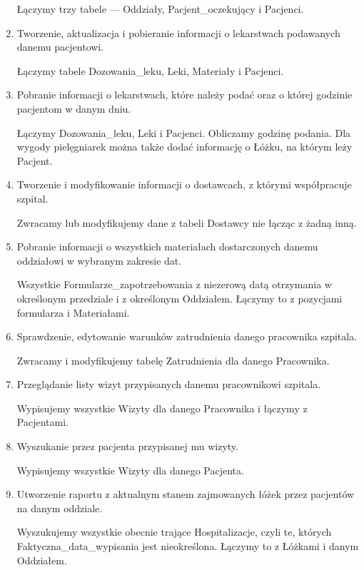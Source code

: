 \begin{enumerate}
Łączymy trzy tabele --- Oddziały, Pacjent\_oczekujący i Pacjenci.

\item Tworzenie, aktualizacja i pobieranie informacji o lekarstwach podawanych danemu pacjentowi.

Łączymy tabele Dozowania\_leku, Leki, Materiały i Pacjenci.

\item Pobranie informacji o lekarstwach, które należy podać oraz o której godzinie pacjentom w danym dniu.

Łączymy Dozowania\_leku, Leki i Pacjenci. Obliczamy godzinę podania. Dla wygody pielęgniarek można także dodać informację o Łóżku, na którym leży Pacjent.

\item Tworzenie i  modyfikowanie informacji o dostawcach, z którymi współpracuje szpital.

Zwracamy lub modyfikujemy dane z tabeli Dostawcy nie łącząc z żadną inną.

\item Pobranie informacji o wszystkich materiałach dostarczonych danemu oddziałowi w wybranym zakresie dat.

Wszystkie Formularze\_zapotrzebowania z niezerową datą otrzymania w określonym przedziale i z określonym Oddziałem. Łączymy to z pozycjami formularza i Materiałami.

\item Sprawdzenie, edytowanie warunków zatrudnienia danego pracownika szpitala.

Zwracamy i modyfikujemy tabelę Zatrudnienia dla danego Pracownika.

\item Przeglądanie listy wizyt przypisanych danemu pracownikowi szpitala.

Wypisujemy wszystkie Wizyty dla danego Pracownika i łączymy z Pacjentami.

\item Wyszukanie przez pacjenta przypisanej mu wizyty.

Wypisujemy wszystkie Wizyty dla danego Pacjenta.

\item Utworzenie raportu z aktualnym stanem zajmowanych łóżek przez pacjentów na danym oddziale.

Wyszukujemy wszystkie obecnie trające Hospitalizacje, czyli te, których Faktyczna\_data\_wypisania jest nieokreślona. Łączymy to z Łóżkami i danym Oddziałem.

\end{enumerate}

